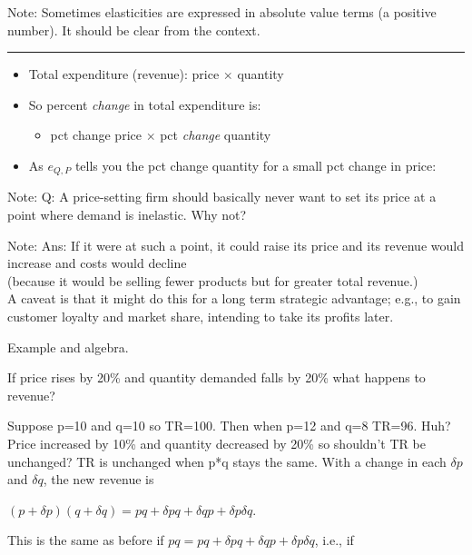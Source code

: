 \documentclass[]{article}
\providecommand{\tightlist}{%
  \setlength{\itemsep}{0pt}\setlength{\parskip}{0pt}}
\begin{document}
Note: Sometimes elasticities are expressed in absolute value terms (a positive number). It should be clear from the context.

\begin{center}\rule{0.5\linewidth}{\linethickness}\end{center}

\begin{itemize}
\tightlist
\item
  Total expenditure (revenue): price \(\times\) quantity
\item
  So percent \emph{change} in total expenditure is:

  \begin{itemize}
  \tightlist
  \item
    pct change price \(\times\) pct \emph{change} quantity
  \end{itemize}
\item
  As \(e_{Q,P}\) tells you the pct change quantity for a small pct change in price:
\end{itemize}

\bigskip

Note: Q: A price-setting firm should basically never want to set its price at a point where demand is inelastic. Why not?

Note: Ans: If it were at such a point, it could raise its price and its revenue would increase and costs would decline\\
(because it would be selling fewer products but for greater total revenue.)\\
A caveat is that it might do this for a long term strategic advantage; e.g., to gain customer loyalty and market share, intending to take its profits later.

\bigskip

Example and algebra.

If price rises by 20\% and quantity demanded falls by 20\% what happens to revenue?

Suppose p=10 and q=10 so TR=100. Then when p=12 and q=8 TR=96. Huh? Price increased by 10\% and quantity decreased by 20\% so shouldn't TR be unchanged?
TR is unchanged when p*q stays the same. With a change in each \(\delta p\) and \(\delta q\), the new revenue is

\((p+\delta p)(q+\delta q) = pq+\delta p q + \delta q p + \delta p \delta q\).

This is the same as before if \(pq=pq+\delta p q + \delta q p + \delta p \delta q\), i.e., if
\end{document}
